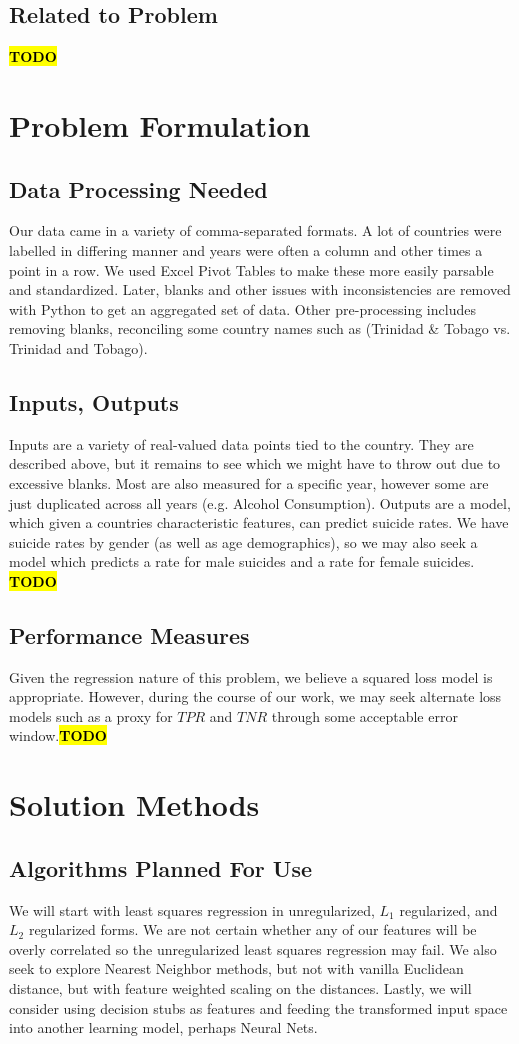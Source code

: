 \documentclass{article}
\newcommand{\TODO}{\textcolor{red}{\textbf{\hl{TODO}}}}
\begin{document}
\begin{multicols}{2}
\subsection{Related to Problem} \TODO

\section{Problem Formulation} 
\subsection{Data Processing Needed} Our data came in a variety of comma-separated formats. A lot of countries were labelled in differing manner and years were often a column and other times a point in a row. We used Excel Pivot Tables to make these more easily parsable and standardized. Later, blanks and other issues with inconsistencies are removed with Python to get an aggregated set of data. Other pre-processing includes removing blanks, reconciling some country names such as (Trinidad \& Tobago vs. Trinidad and Tobago).
\subsection{Inputs, Outputs} Inputs are a variety of real-valued data points tied to the country. They are described above, but it remains to see which we might have to throw out due to excessive blanks. Most are also measured for a specific year, however some are just duplicated across all years (e.g. Alcohol Consumption). Outputs are a model, which given a countries characteristic features, can predict suicide rates. We have suicide rates by gender (as well as age demographics), so we may also seek a model which predicts a rate for male suicides and a rate for female suicides.  \TODO
\subsection{Performance Measures} Given the regression nature of this problem, we believe a squared loss model is appropriate. However, during the course of our work, we may seek alternate loss models such as a proxy for $TPR$ and $TNR$ through some acceptable error window.\TODO


\section{Solution Methods}
\subsection{Algorithms Planned For Use} We will start with least squares regression in unregularized, $L_1$ regularized, and $L_2$ regularized forms. We are not certain whether any of our features will be overly correlated so the unregularized least squares regression may fail. We also seek to explore Nearest Neighbor methods, but not with vanilla Euclidean distance, but with feature weighted scaling on the distances. Lastly, we will consider using decision stubs as features and feeding the transformed input space into another learning model, perhaps Neural Nets.

\end{multicols}
\end{document}
